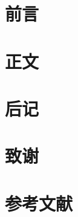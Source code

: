 \documentclass[fancy]{ctexbook}
\begin{document}
\frontmatter
\chapter{前言}
\tableofcontents
{}

\mainmatter
\chapter{正文}

\backmatter
\chapter{后记}
\chapter{致谢}
\chapter{参考文献}
\end{document}
